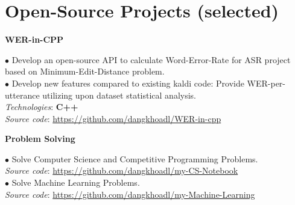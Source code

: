 \documentclass[10pt]{article}
\begin{document}
    \section{Open-Source Projects (selected)}
        \begin{flushleft}
            \textbf{WER-in-CPP}
        \end{flushleft}
        \vspace{-1.5mm}
        $\bullet$ Develop an open-source API to calculate Word-Error-Rate for ASR project based on Minimum-Edit-Distance problem. \\
        $\bullet$ Develop new features compared to existing kaldi code: Provide WER-per-utterance utilizing upon dataset statistical analysis. \\    
            \emph{Technologies}: \textbf{C++} \\
            \emph{Source code}: \href{https://github.com/dangkhoadl/WER-in-cpp}{https://github.com/dangkhoadl/WER-in-cpp} \\

        \begin{flushleft}
            \textbf{Problem Solving}
        \end{flushleft}
        \vspace{-1.5mm}
        $\bullet$ Solve Computer Science and Competitive Programming Problems. \\
        	\emph{Source code}: \href{https://github.com/dangkhoadl/my-CS-Notebook}{https://github.com/dangkhoadl/my-CS-Notebook} \\
        $\bullet$ Solve Machine Learning Problems. \\
        	\emph{Source code}: \href{https://github.com/dangkhoadl/my-Machine-Learning}{https://github.com/dangkhoadl/my-Machine-Learning} \\
\end{document}
